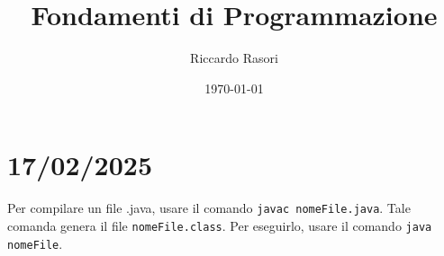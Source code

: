 \documentclass{article}
\begin{document}
\title{Fondamenti di Programmazione}
\author{Riccardo Rasori}
\date{\today}

\maketitle

\section{17/02/2025}


\begin{important}
    Per compilare un file .java, usare il comando \texttt{javac nomeFile.java}.
    Tale comanda genera il file \texttt{nomeFile.class}.
    Per eseguirlo, usare il comando \texttt{java nomeFile}.
\end{important}
\end{document}
